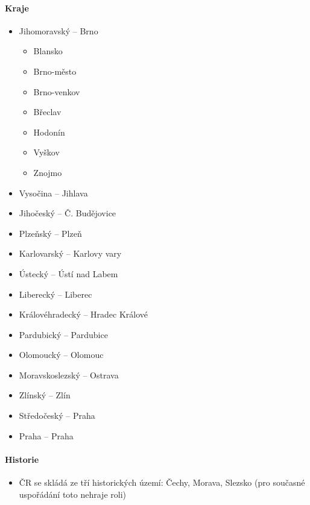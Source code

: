 \paragraph{Kraje}
\begin{itemize}
\item Jihomoravský -- Brno
	\begin{itemize}
	\item Blansko
	\item Brno-město
	\item Brno-venkov
	\item Břeclav
	\item Hodonín
	\item Vyškov
	\item Znojmo
	\end{itemize}
\item Vysočina -- Jihlava
\item Jihočeský -- Č. Budějovice
\item Plzeňský -- Plzeň
\item Karlovarský -- Karlovy vary
\item Ústecký -- Ústí nad Labem
\item Liberecký -- Liberec
\item Královéhradecký -- Hradec Králové
\item Pardubický -- Pardubice
\item Olomoucký -- Olomouc
\item Moravskoslezský -- Ostrava
\item Zlínský -- Zlín
\item Středočeský -- Praha 
\item Praha -- Praha
\end{itemize}

\paragraph{Historie}
\begin{itemize}
\item ČR se skládá ze tří historických území: Čechy, Morava, Slezsko (pro současné uspořádání toto nehraje roli)
\end{itemize}

